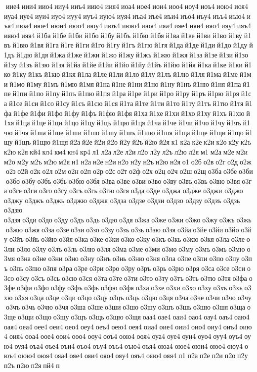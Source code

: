  иие4 иии4 иио4 ииу4 ииъ4 иию4 иия4 иоа4 иое4 иои4 иоо4 иоу4 иоъ4 иою4 иоя4 иуа4 иуе4 иуи4 иуо4 иуу4 иуъ4 иую4 иуя4 иъа4 иъе4 иъи4 иъо4 иъу4 иъъ4 иъю4 иъя4 июа4 июе4 июи4 июо4 июу4 июъ4 июю4 июя4 ияа4 ияе4 ияи4 ияо4 ияу4 ияъ4 ияю4 ияя4 й1ба й1бе й1би й1бо й1бу й1бъ й1бю й1бя й1ва й1ве й1ви й1во й1ву й1въ й1вю й1вя й1га й1ге й1ги й1го й1гу й1гъ й1гю й1гя й1да й1де й1ди й1до й1ду й1дъ й1дю й1дя й1жа й1же й1жи й1жо й1жу й1жъ й1жю й1жя й1за й1зе й1зи й1зо й1зу й1зъ й1зю й1зя й1йа й1йе й1йи й1йо й1йу й1йъ й1йю й1йя й1ка й1ке й1ки й1ко й1ку й1къ й1кю й1кя й1ла й1ле й1ли й1ло й1лу й1лъ й1лю й1ля й1ма й1ме й1ми й1мо й1му й1мъ й1мю й1мя й1на й1не й1ни й1но й1ну й1нъ й1ню й1ня й1па й1пе й1пи й1по й1пу й1пъ й1пю й1пя й1ра й1ре й1ри й1ро й1ру й1ръ й1рю й1ря й1са й1се й1си й1со й1су й1съ й1сю й1ся й1та й1те й1ти й1то й1ту й1тъ й1тю й1тя й1фа й1фе й1фи й1фо й1фу й1фъ й1фю й1фя й1ха й1хе й1хи й1хо й1ху й1хъ й1хю й1хя й1ца й1це й1ци й1цо й1цу й1цъ й1цю й1ця й1ча й1че й1чи й1чо й1чу й1чъ й1чю й1чя й1ша й1ше й1ши й1шо й1шу й1шъ й1шю й1шя й1ща й1ще й1щи й1що й1щу й1щъ й1щю й1щя й2а й2е й2и й2о й2у й2ъ й2ю й2я к1 к2а к2е к2и к2о к2у к2ъ к2ю к2я кй4 кл4 км4 кн4 кр4 л1 л2а л2е л2и л2о л2у л2ъ л2ю л2я м1 м2а м2е м2и м2о м2у м2ъ м2ю м2я н1 н2а н2е н2и н2о н2у н2ъ н2ю н2я о1 о2б о2в о2г о2д о2ж о2з о2й о2к о2л о2м о2н о2п о2р о2с о2т о2ф о2х о2ц о2ч о2ш о2щ о3ба о3бе о3би о3бо о3бу о3бъ о3бь о3бю о3бя о3ва о3ве о3ви о3во о3ву о3въ о3вь о3вю о3вя о3га о3ге о3ги о3го о3гу о3гъ о3гь о3гю о3гя о3да о3де 	о3джа 	о3дже 	о3джи 	о3джо 	о3джу 	о3джъ 	о3джь 	о3джю 	о3джя 	о3дза 	о3дзе 	о3дзи 	о3дзо 	о3дзу 	о3дзъ 	о3дзь 	о3дзю 	о3дзя о3ди о3до о3ду о3дъ о3дь о3дю о3дя о3жа о3же о3жи о3жо о3жу о3жъ о3жь о3жю о3жя о3за о3зе о3зи о3зо о3зу о3зъ о3зь о3зю о3зя о3йа о3йе о3йи о3йо о3йу о3йъ о3йь о3йю о3йя о3ка о3ке о3ки о3ко о3ку о3къ о3кь о3кю о3кя о3ла о3ле о3ли о3ло о3лу о3лъ о3ль о3лю о3ля о3ма о3ме о3ми о3мо о3му о3мъ о3мь о3мю о3мя о3на о3не о3ни о3но о3ну о3нъ о3нь о3ню о3ня о3па о3пе о3пи о3по о3пу о3пъ о3пь о3пю о3пя о3ра о3ре о3ри о3ро о3ру о3ръ о3рь о3рю о3ря о3са о3се о3си о3со о3су о3съ о3сь о3сю о3ся о3та о3те о3ти о3то о3ту о3тъ о3ть о3тю о3тя о3фа о3фе о3фи о3фо о3фу о3фъ о3фь о3фю о3фя о3ха о3хе о3хи о3хо о3ху о3хъ о3хь о3хю о3хя о3ца о3це о3ци о3цо о3цу о3цъ о3ць о3цю о3ця о3ча о3че о3чи о3чо о3чу о3чъ о3чь о3чю о3чя о3ша о3ше о3ши о3шо о3шу о3шъ о3шь о3шю о3шя о3ща о3ще о3щи о3що о3щу о3щъ о3щь о3щю о3щя оаа4 оае4 оаи4 оао4 оау4 оаъ4 оаю4 оая4 оеа4 оее4 оеи4 оео4 оеу4 оеъ4 оею4 оея4 оиа4 оие4 оии4 оио4 оиу4 оиъ4 оию4 оия4 ооа4 оое4 оои4 ооо4 ооу4 ооъ4 оою4 ооя4 оуа4 оуе4 оуи4 оуо4 оуу4 оуъ4 оую4 оуя4 оъа4 оъе4 оъи4 оъо4 оъу4 оъъ4 оъю4 оъя4 оюа4 оюе4 оюи4 оюо4 оюу4 оюъ4 оюю4 оюя4 ояа4 ояе4 ояи4 ояо4 ояу4 ояъ4 ояю4 ояя4 п1 п2а п2е п2и п2о п2у п2ъ п2ю п2я пй4 п